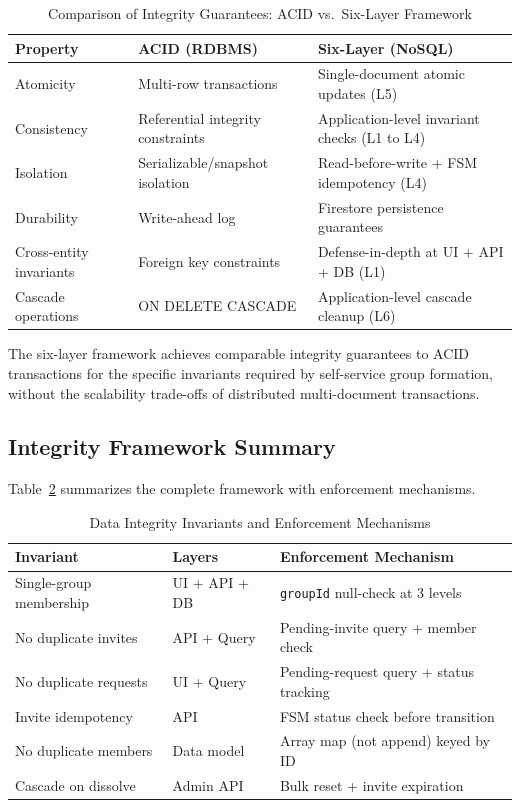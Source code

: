 \documentclass[11pt,a4paper]{article}
\theoremstyle{plain}
\theoremstyle{definition}
\theoremstyle{remark}
\begin{document}
\begin{table}[htbp]
\centering
\caption{Comparison of Integrity Guarantees: ACID vs.\ Six-Layer Framework}
\label{tab:acid}
\small
\renewcommand{\arraystretch}{1.15}
\begin{tabular}{@{}p{2.5cm}p{3.5cm}p{3.5cm}@{}}
\toprule
\textbf{Property} & \textbf{ACID (RDBMS)} & \textbf{Six-Layer (NoSQL)} \\
\midrule
Atomicity & Multi-row transactions & Single-document atomic updates (L5) \\
Consistency & Referential integrity constraints & Application-level invariant checks (L1 to L4) \\
Isolation & Serializable/snapshot isolation & Read-before-write + FSM idempotency (L4) \\
Durability & Write-ahead log & Firestore persistence guarantees \\
\midrule
Cross-entity invariants & Foreign key constraints & Defense-in-depth at UI + API + DB (L1) \\
Cascade operations & ON DELETE CASCADE & Application-level cascade cleanup (L6) \\
\bottomrule
\end{tabular}
\end{table}

The six-layer framework achieves comparable integrity guarantees to ACID transactions for the specific invariants required by self-service group formation, without the scalability trade-offs of distributed multi-document transactions.

\subsection{Integrity Framework Summary}

Table~\ref{tab:duplication} summarizes the complete framework with enforcement mechanisms.

\begin{table}[htbp]
\centering
\caption{Data Integrity Invariants and Enforcement Mechanisms}
\label{tab:duplication}
\small
\renewcommand{\arraystretch}{1.15}
\begin{tabular}{@{}p{3cm}p{2cm}p{4.5cm}@{}}
\toprule
\textbf{Invariant} & \textbf{Layers} & \textbf{Enforcement Mechanism} \\
\midrule
Single-group membership & UI + API + DB & \texttt{groupId} null-check at 3 levels \\
No duplicate invites & API + Query & Pending-invite query + member check \\
No duplicate requests & UI + Query & Pending-request query + status tracking \\
Invite idempotency & API & FSM status check before transition \\
No duplicate members & Data model & Array map (not append) keyed by ID \\
Cascade on dissolve & Admin API & Bulk reset + invite expiration \\
\bottomrule
\end{tabular}
\end{table}
\end{document}
